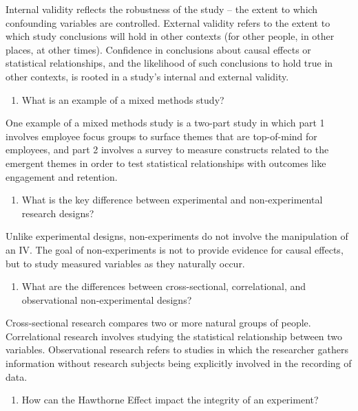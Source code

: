 \documentclass[]{book}
\providecommand{\tightlist}{%
  \setlength{\itemsep}{0pt}\setlength{\parskip}{0pt}}
\begin{document}
Internal validity reflects the robustness of the study -- the extent to which confounding variables are controlled. External validity refers to the extent to which study conclusions will hold in other contexts (for other people, in other places, at other times). Confidence in conclusions about causal effects or statistical relationships, and the likelihood of such conclusions to hold true in other contexts, is rooted in a study's internal and external validity.

\begin{enumerate}
\def\labelenumi{\arabic{enumi}.}
\setcounter{enumi}{6}
\tightlist
\item
  What is an example of a mixed methods study?
\end{enumerate}

One example of a mixed methods study is a two-part study in which part 1 involves employee focus groups to surface themes that are top-of-mind for employees, and part 2 involves a survey to measure constructs related to the emergent themes in order to test statistical relationships with outcomes like engagement and retention.

\begin{enumerate}
\def\labelenumi{\arabic{enumi}.}
\setcounter{enumi}{7}
\tightlist
\item
  What is the key difference between experimental and non-experimental research designs?
\end{enumerate}

Unlike experimental designs, non-experiments do not involve the manipulation of an IV. The goal of non-experiments is not to provide evidence for causal effects, but to study measured variables as they naturally occur.

\begin{enumerate}
\def\labelenumi{\arabic{enumi}.}
\setcounter{enumi}{8}
\tightlist
\item
  What are the differences between cross-sectional, correlational, and observational non-experimental designs?
\end{enumerate}

Cross-sectional research compares two or more natural groups of people. Correlational research involves studying the statistical relationship between two variables. Observational research refers to studies in which the researcher gathers information without research subjects being explicitly involved in the recording of data.

\begin{enumerate}
\def\labelenumi{\arabic{enumi}.}
\setcounter{enumi}{9}
\tightlist
\item
  How can the Hawthorne Effect impact the integrity of an experiment?
\end{enumerate}
\end{document}
